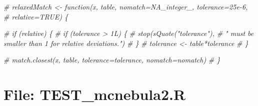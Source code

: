 \documentclass[
]{article}
\newenvironment{Shaded}{\begin{snugshade}}{\end{snugshade}}
\newcommand{\CommentTok}[1]{\textcolor[rgb]{0.56,0.35,0.01}{\textit{#1}}}
\begin{document}
\begin{Shaded}
\begin{Highlighting}[]
\CommentTok{\# relaxedMatch \textless{}{-} function(x, table, nomatch=NA\_integer\_, tolerance=25e{-}6,}
\CommentTok{\#                          relative=TRUE) \{}

\CommentTok{\#   if (relative) \{}
\CommentTok{\#     if (tolerance \textgreater{} 1L) \{}
\CommentTok{\#       stop(sQuote("tolerance"),}
\CommentTok{\#            " must be smaller than 1 for relative deviations.")}
\CommentTok{\#     \}}
\CommentTok{\#     tolerance \textless{}{-} table*tolerance}
\CommentTok{\#   \}}

\CommentTok{\#   match.closest(x, table, tolerance=tolerance, nomatch=nomatch)}
\CommentTok{\# \}}
\end{Highlighting}
\end{Shaded}

\hypertarget{file-test_mcnebula2.r}{%
\section{File: TEST\_mcnebula2.R}\label{file-test_mcnebula2.r}}
\end{document}
